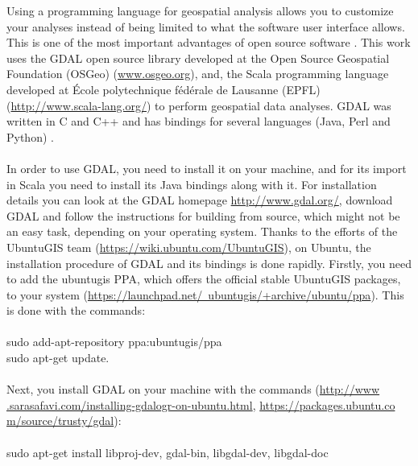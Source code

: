 \documentclass {article}
\begin{document}
Using a programming language for geospatial analysis allows you to customize your analyses instead of being limited to what the software user interface allows.
 This is one of the most important advantages of open source software \cite{garrard_geoprocessing_2016}.
This work uses the GDAL open source library \cite{osgeo_gdal_nodate} developed at the Open Source Geospatial Foundation (OSGeo) (\href{www.osgeo.org}{www.osgeo.org}), and, the Scala programming language developed at \'Ecole polytechnique f\'ed\'erale de Lausanne (EPFL) (\href{http://www.scala-lang.org/}{http://www.scala-lang.org/}) to perform geospatial data analyses. GDAL was written in C and C++ and has bindings for several languages (Java, Perl and Python) \cite{garrard_geoprocessing_2016}.  
\\
\\
In order to use GDAL, you need to install it on your machine, and for its import in Scala you need to install its Java bindings along with it.  
For installation details you can look at the GDAL homepage \href{http://www.gdal.org/}{http://www.gdal.org/}, download GDAL and follow the instructions for building from source, which might not be an easy task, depending on your operating system. 
Thanks to the efforts of the UbuntuGIS team (\href{https://wiki.ubuntu.com/UbuntuGIS}{https://wiki.ubuntu.com/UbuntuGIS}), on Ubuntu, the installation procedure of GDAL and its bindings is done rapidly. Firstly, you need to add the ubuntugis PPA, which offers the official stable UbuntuGIS packages, to your system (\href{https://launchpad.net/~ubuntugis/+archive/ubuntu/ppa}{https://launchpad.net/~ubuntugis/+archive/ubuntu/ppa}). This is done with the commands: \\
\\
sudo add-apt-repository ppa:ubuntugis/ppa \\
sudo apt-get update.\\
\\
Next, you install GDAL on your machine with the commands \cite{safavi_installing_2015} \cite{canonical_ubuntugis_nodate} (\href{http://www.sarasafavi.com/installing-gdalogr-on-ubuntu.html}{http://www\\.sarasafavi.com/installing-gdalogr-on-ubuntu.html}, \href{https://packages.ubuntu.com/source/trusty/gdal}{https://packages.ubuntu.co\\m/source/trusty/gdal}):\\
\\
sudo apt-get install libproj-dev, gdal-bin, libgdal-dev, libgdal-doc \\
\end{document}
